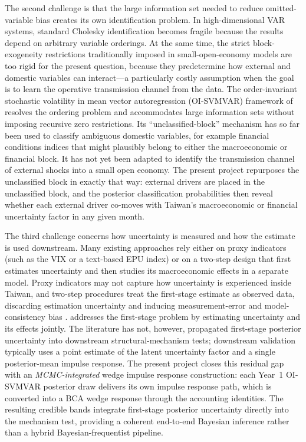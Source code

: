 \documentclass[12pt]{article}
\begin{document}
The second challenge is that the large information set needed to reduce omitted-variable bias creates its own identification problem. In high-dimensional VAR systems, standard Cholesky identification becomes fragile because the results depend on arbitrary variable orderings. At the same time, the strict block-exogeneity restrictions traditionally imposed in small-open-economy models are too rigid for the present question, because they predetermine how external and domestic variables can interact---a particularly costly assumption when the goal is to learn the operative transmission channel from the data. The order-invariant stochastic volatility in mean vector autoregression (OI-SVMVAR) framework of \citet{davidson2025investigating} resolves the ordering problem and accommodates large information sets without imposing recursive zero restrictions. Its ``unclassified-block'' mechanism has so far been used to classify ambiguous domestic variables, for example financial conditions indices that might plausibly belong to either the macroeconomic or financial block. It has not yet been adapted to identify the transmission channel of external shocks into a small open economy. The present project repurposes the unclassified block in exactly that way: external drivers are placed in the unclassified block, and the posterior classification probabilities then reveal whether each external driver co-moves with Taiwan's macroeconomic or financial uncertainty factor in any given month.

The third challenge concerns how uncertainty is measured and how the estimate is used downstream. Many existing approaches rely either on proxy indicators (such as the VIX or a text-based EPU index) or on a two-step design that first estimates uncertainty and then studies its macroeconomic effects in a separate model. Proxy indicators may not capture how uncertainty is experienced inside Taiwan, and two-step procedures treat the first-stage estimate as observed data, discarding estimation uncertainty and inducing measurement-error and model-consistency bias \citep{carriero2018measuring}. \citet{davidson2025investigating} addresses the first-stage problem by estimating uncertainty and its effects jointly. The literature has not, however, propagated first-stage posterior uncertainty into downstream structural-mechanism tests; downstream validation typically uses a point estimate of the latent uncertainty factor and a single posterior-mean impulse response. The present project closes this residual gap with an \textit{MCMC-integrated} wedge impulse response construction: each Year~1 OI-SVMVAR posterior draw delivers its own impulse response path, which is converted into a BCA wedge response through the accounting identities. The resulting credible bands integrate first-stage posterior uncertainty directly into the mechanism test, providing a coherent end-to-end Bayesian inference rather than a hybrid Bayesian-frequentist pipeline.
\end{document}
